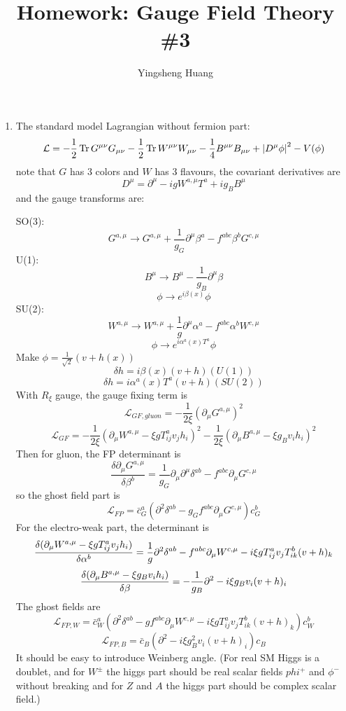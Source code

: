 \documentclass{article}
\title{Homework: Gauge Field Theory \#3}
\author{Yingsheng Huang}
\renewcommand{\a}{\alpha}
\renewcommand{\b}{\beta}
\newcommand{\lag}{\mathcal{L}}
\begin{document}
\maketitle
\begin{enumerate}[{\bf 1.}]
  \item The standard model Lagrangian without fermion part:
	$$\lag=-\frac{1}{2}\Tr G^{\mu\nu}G_{\mu\nu}-\frac{1}{2}\Tr W^{\mu\nu}W_{\mu\nu}-\frac{1}{4}B^{\mu\nu}B_{\mu\nu}+\abs{D^{\mu}\phi}^2-V(\phi)$$
	  note that $G$ has 3 colors and $W$ has 3 flavours, the covariant derivatives are
	  $$D^{\mu}=\partial^{\mu}-igW^{a,\mu}T^a+ig_BB^{\mu}$$
		and the gauge transforms are:

    SO(3):
    $$G^{a,\mu}\rightarrow G^{a,\mu}+\frac{1}{g_G}\partial^{\mu}\b^a-f^{abc}\b^bG^{c,\mu}$$
		U(1):
		$$B^{\mu}\rightarrow B^{\mu}-\frac{1}{g_B}\partial^{\mu}\b$$
		$$\phi\rightarrow e^{i\b(x)}\phi$$
		SU(2):
		$$W^{a,\mu}\rightarrow W^{a,\mu}+\frac{1}{g}\partial^{\mu}\a^a-f^{abc}\a^bW^{c,\mu}$$
		$$\phi\rightarrow e^{i\a^a(x)T^a}\phi$$
		Make $\phi=\frac{1}{\sqrt{2}}(v+h(x))$
		$$\delta h=i\b(x)(v+h)(U(1))$$
    $$\delta h=i\a^a(x)T^a(v+h)(SU(2))$$
	  With $R_{\xi}$ gauge, the gauge fixing term is
    $$\lag_{GF,gluon}=-\frac{1}{2\xi}(\partial_{\mu}G^{a,\mu})^2$$
	  $$\lag_{GF}=-\frac{1}{2\xi}(\partial_{\mu}W^{a,\mu}-\xi gT^a_{ij}v_jh_i)^2-\frac{1}{2\xi}(\partial_{\mu}B^{a,\mu}-\xi g_Bv_ih_i)^2$$
    Then for gluon, the FP determinant is
    $$\frac{\delta \partial_{\mu}G^{a,\mu}}{\delta \b^b}=\frac{1}{g_G}\partial_{\mu}\partial^{\mu}\delta^{ab}-f^{abc}\partial_{\mu}G^{c,\mu}$$
    so the ghost field part is
    $$\lag_{FP}=\bar c_G^a(\partial^2\delta^{ab}-g_Gf^{abc}\partial_{\mu}G^{c,\mu})c_G^b$$
    For the electro-weak part, the determinant is
    $$\fdv{(\partial_{\mu}W^{a,\mu}-\xi gT^a_{ij}v_jh_i)}{\a^b}=\frac{1}{g}\partial^2\delta^{ab}-f^{abc}\partial_{\mu}W^{c,\mu}-i\xi gT^a_{ij}v_jT^b_{ik}(v+h)_k$$
    $$\fdv{(\partial_{\mu}B^{a,\mu}-\xi g_Bv_ih_i)}{\b}=-\frac{1}{g_B}\partial^2-i\xi g_Bv_i(v+h)_i$$
    The ghost fields are
    $$\lag_{FP,W}=\bar c_W^a(\partial^2\delta^{ab}-gf^{abc}\partial_{\mu}W^{c,\mu}-i\xi gT^a_{ij}v_jT^b_{ik}(v+h)_k)c_W^b$$
    $$\lag_{FP,B}=\bar c_B(\partial^2-i\xi g_B^2v_i(v+h)_i)c_B$$
    It should be easy to introduce Weinberg angle. (For real SM Higgs is a doublet, and for $W^{\pm}$ the higgs part should be real scalar fields $phi^+$ and $\phi^-$ without breaking and for $Z$ and $A$ the higgs part should be complex scalar field.)



\end{enumerate}
\end{document}
